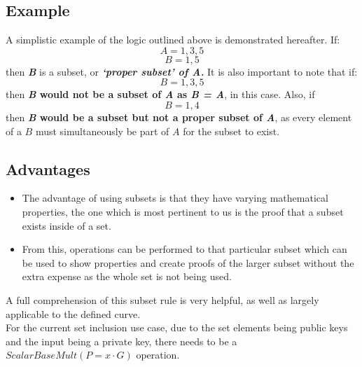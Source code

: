 \documentclass{article}
\begin{document}
\subsection{Example}
A simplistic example of the logic outlined above is demonstrated hereafter. If:  $$ A={1,3,5} $$
$$ B={1,5} $$ then \textbf{\textit{B}} is a subset, or \textbf{\textit{‘proper subset’ of A.}} 
It is also important to note that if: $$ B={1,3,5} $$ then \textbf{\textit{B} would not be a subset of \textit{A} as \textit{B = A}}, in this case. Also, if $$ B={1,4} $$ then \textbf{\textit{B} would be a subset but not a proper subset of \textit{A}}, as every element of a $B$ must simultaneously be part of $A$ for the subset to exist.
\subsection{Advantages}
\begin{itemize}
    \item The advantage of using subsets is that they have varying mathematical properties, the one which is most pertinent to us is the proof that a subset exists inside of a set.
    \item From this, operations can be performed to that particular subset which can be used to show properties and create proofs of the larger subset without the extra expense as the whole set is not being used.
\end{itemize}
A full comprehension of this subset rule is very helpful, as well as largely applicable to the defined curve. \\
For the current set inclusion use case, due to the set elements being public keys and the input being a private key, there needs to be a $ScalarBaseMult (P=x\cdot G)$ operation.
\end{document}
